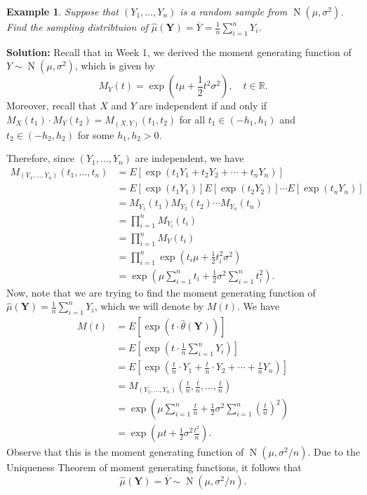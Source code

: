 \documentclass[10pt]{article}
\newcommand{\R}{\mathbb{R}}
\DeclareMathOperator{\Nor}{N}
\theoremstyle{newstyle}
\newtheorem{exmp}[thm]{Example}
\begin{document}
\begin{exmp}
Suppose that $(Y_1, \dots, Y_n)$ is a random sample from $\Nor(\mu, \sigma^2)$. 
Find the sampling distribtuion of $\hat\mu(\mathbf Y) = \overline Y = \frac1n \sum_{i=1}^n Y_i$. 
\end{exmp}
{\color{blue}
{\bf Solution:} 
Recall that in Week 1, we derived the moment generating function of $Y \sim \Nor(\mu, \sigma^2)$, 
which is given by 
\[ M_Y(t) = \exp\left(t\mu + \frac12 t^2 \sigma^2\right), \quad t \in \R. \]
Moreover, recall that $X$ and $Y$ are independent if and only if $M_X(t_1) \cdot M_Y(t_2) 
= M_{(X,Y)}(t_1, t_2)$ for all $t_1 \in (-h_1, h_1)$ and $t_2 \in (-h_2, h_2)$ for some 
$h_1, h_2 > 0$. 

Therefore, since $(Y_1, \dots, Y_n)$ are independent, we have 
\begin{align*}
    M_{(Y_1, \dots, Y_n)}(t_1, \dots, t_n) 
    &= E [ \exp(t_1Y_1 + t_2Y_2 + \cdots + t_nY_n) ] \\
    &= E [ \exp(t_1 Y_1) ] E [ \exp(t_2 Y_2) ] \cdots E [ \exp(t_n Y_n) ] \\
    &= M_{Y_1}(t_1) M_{Y_2}(t_2) \cdots M_{Y_n}(t_n) \\
    &= \prod_{i=1}^n M_{Y_i}(t_i) \\
    &= \prod_{i=1}^n M_Y(t_i) \\
    &= \prod_{i=1}^n \exp \left(t_i \mu + \frac12 t_i^2 \sigma^2 \right) \\
    &= \exp \left( \mu \sum_{i=1}^n t_i + \frac12 \sigma^2 \sum_{i=1}^n t_i^2 \right). 
\end{align*}
\newpage 
Now, note that we are trying to find the moment generating function of 
$\hat\mu(\mathbf Y) = \frac1n \sum_{i=1}^n Y_i$, which we will denote by $M(t)$. We have 
\begin{align*}
    M(t) &= 
    E [ \exp(t \cdot \hat\theta(\mathbf Y)) ] \\
    &= E \left[ \exp \left( t \cdot \frac1n \sum_{i=1}^n Y_i \right) \right] \\
    &= E \left[ \exp \left( \frac tn \cdot Y_1 + \frac tn \cdot Y_2 + \cdots + \frac tn Y_n \right)
    \right] \\
    &= M_{(Y_1, \dots, Y_n)}\left( \frac tn, \frac tn, \dots, \frac tn \right) \\
    &= \exp \left( \mu \sum_{i=1}^n \frac tn + \frac12 \sigma^2 \sum_{i=1}^n \left( \frac tn \right)^2 
    \right) \\
    &= \exp \left( \mu t + \frac12 \sigma^2 \frac{t^2}n \right).
\end{align*}
Observe that this is the moment generating function of $\Nor(\mu, \sigma^2/n)$. 
Due to the Uniqueness Theorem of moment generating functions, it follows that 
\[ \hat\mu(\mathbf Y) = \overline Y \sim \Nor(\mu, \sigma^2/n). \]}
\end{document}
